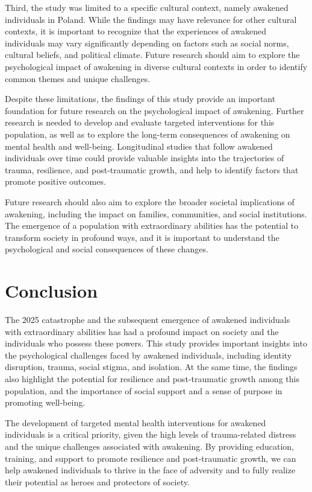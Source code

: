 \documentclass[12pt, a4paper]{article}
\begin{document}
Third, the study was limited to a specific cultural context, namely awakened individuals in Poland. While the findings may have relevance for other cultural contexts, it is important to recognize that the experiences of awakened individuals may vary significantly depending on factors such as social norms, cultural beliefs, and political climate. Future research should aim to explore the psychological impact of awakening in diverse cultural contexts in order to identify common themes and unique challenges.

Despite these limitations, the findings of this study provide an important foundation for future research on the psychological impact of awakening. Further research is needed to develop and evaluate targeted interventions for this population, as well as to explore the long-term consequences of awakening on mental health and well-being. Longitudinal studies that follow awakened individuals over time could provide valuable insights into the trajectories of trauma, resilience, and post-traumatic growth, and help to identify factors that promote positive outcomes.

Future research should also aim to explore the broader societal implications of awakening, including the impact on families, communities, and social institutions. The emergence of a population with extraordinary abilities has the potential to transform society in profound ways, and it is important to understand the psychological and social consequences of these changes.

\section{Conclusion}
The 2025 catastrophe and the subsequent emergence of awakened individuals with extraordinary abilities has had a profound impact on society and the individuals who possess these powers. This study provides important insights into the psychological challenges faced by awakened individuals, including identity disruption, trauma, social stigma, and isolation. At the same time, the findings also highlight the potential for resilience and post-traumatic growth among this population, and the importance of social support and a sense of purpose in promoting well-being.

The development of targeted mental health interventions for awakened individuals is a critical priority, given the high levels of trauma-related distress and the unique challenges associated with awakening. By providing education, training, and support to promote resilience and post-traumatic growth, we can help awakened individuals to thrive in the face of adversity and to fully realize their potential as heroes and protectors of society.
\end{document}
